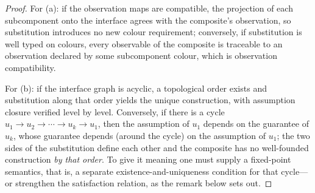 \begin{proof}
For (a): if the observation maps are compatible, the projection of each subcomponent onto
the interface agrees with the composite's observation, so substitution introduces no new
colour requirement; conversely, if substitution is well typed on colours, every observable
of the composite is traceable to an observation declared by some subcomponent colour, which
is observation compatibility.

For (b): if the interface graph is acyclic, a topological order exists and substitution
along that order yields the unique construction, with assumption closure verified level by
level. Conversely, if there is a cycle $u_1 \to u_2 \to \cdots \to u_k \to u_1$, then the
assumption of $u_1$ depends on the guarantee of $u_k$, whose guarantee depends (around the
cycle) on the assumption of $u_1$; the two sides of the substitution define each other and
the composite has no well-founded construction \emph{by that order}. To give it meaning one
must supply a fixed-point semantics, that is, a separate existence-and-uniqueness condition for that
cycle---or strengthen the satisfaction relation, as the remark below sets out.
\end{proof}


